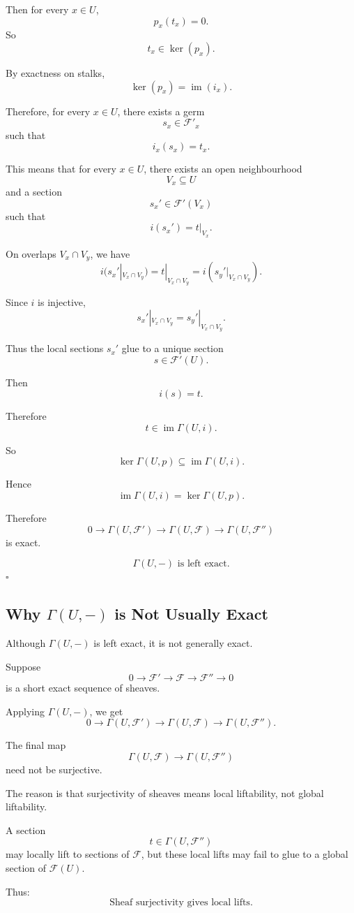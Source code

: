 \documentclass[12pt,a4paper]{article}
\DeclareMathOperator{\im}{im}
\newcommand{\F}{\mathcal F}
\theoremstyle{notespace}
\newcommand{\Fp}{\mathcal F'}      %
\newcommand{\Fpp}{\mathcal F''}
\begin{document}
Then for every \(x\in U\),
\[
p_x(t_x)=0.
\]
So
\[
t_x\in \ker(p_x).
\]

By exactness on stalks,
\[
\ker(p_x)=\im(i_x).
\]

Therefore, for every \(x\in U\), there exists a germ
\[
s_x\in \Fp_x
\]
such that
\[
i_x(s_x)=t_x.
\]

This means that for every \(x\in U\), there exists an open neighbourhood
\[
V_x\subseteq U
\]
and a section
\[
s_x'\in \Fp(V_x)
\]
such that
\[
i(s_x')=t|_{V_x}.
\]

On overlaps \(V_x\cap V_y\), we have
\[
i(s_x'|_{V_x\cap V_y})
=
t|_{V_x\cap V_y}
=
i(s_y'|_{V_x\cap V_y}).
\]

Since \(i\) is injective,
\[
s_x'|_{V_x\cap V_y}
=
s_y'|_{V_x\cap V_y}.
\]

Thus the local sections \(s_x'\) glue to a unique section
\[
s\in \Fp(U).
\]

Then
\[
i(s)=t.
\]

Therefore
\[
t\in \im\Gamma(U,i).
\]

So
\[
\ker \Gamma(U,p)\subseteq \im \Gamma(U,i).
\]

Hence
\[
\im \Gamma(U,i)=\ker \Gamma(U,p).
\]

Therefore
\[
0\to \Gamma(U,\Fp)
\to \Gamma(U,\F)
\to \Gamma(U,\Fpp)
\]
is exact.

\[
\boxed{
	\Gamma(U,-)\text{ is left exact.}
}
\]
\(\square\)

\subsection{Why \texorpdfstring{\(\Gamma(U,-)\)}{Gamma(U,-)} is Not Usually Exact}

Although \(\Gamma(U,-)\) is left exact, it is not generally exact.

Suppose
\[
0\to \Fp\to \F\to \Fpp\to 0
\]
is a short exact sequence of sheaves.

Applying \(\Gamma(U,-)\), we get
\[
0\to \Gamma(U,\Fp)
\to \Gamma(U,\F)
\to \Gamma(U,\Fpp).
\]

The final map
\[
\Gamma(U,\F)\to \Gamma(U,\Fpp)
\]
need not be surjective.

The reason is that surjectivity of sheaves means local liftability, not global liftability.

A section
\[
t\in \Gamma(U,\Fpp)
\]
may locally lift to sections of \(\F\), but these local lifts may fail to glue to a global section of \(\F(U)\).

Thus:
\[
\boxed{
	\text{Sheaf surjectivity gives local lifts.}
}
\]
\end{document}
